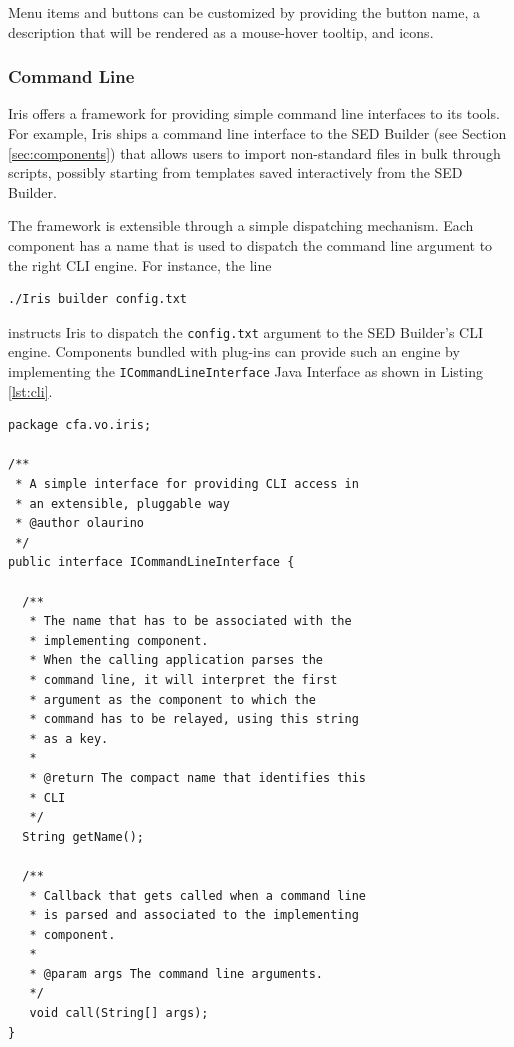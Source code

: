 \documentclass[preprint,authoryear,5p]{elsarticle}
\begin{document}
Menu items and buttons can be customized by providing the button name, a
description that will be rendered as a mouse-hover tooltip, and icons.

\subsubsection{Command Line} Iris offers a framework for providing simple
command line interfaces to its tools. For example, Iris ships a command line
interface to the SED Builder (see Section \ref{sec:components}) that allows
users to import non-standard files in bulk through scripts, possibly starting
from templates saved interactively from the SED Builder.

The framework is extensible through a simple dispatching mechanism. Each
component has a name that is used to dispatch the command line argument to the
right CLI engine. For instance, the line
\begin{lstlisting}[style=code]
./Iris builder config.txt
\end{lstlisting}
instructs Iris to dispatch the \verb|config.txt| argument to the SED Builder's
CLI engine. Components bundled with plug-ins can provide such an engine by implementing the
\verb|ICommandLineInterface| Java Interface as shown in Listing \ref{lst:cli}.


\begin{lstlisting}[style=java,
	caption={Every Iris component can expose a command line interface. Iris dispatches the command line arguments for the relative component to process. This code is written in Java.},
	label=lst:cli]
package cfa.vo.iris;

/**
 * A simple interface for providing CLI access in 
 * an extensible, pluggable way
 * @author olaurino
 */
public interface ICommandLineInterface {

  /**
   * The name that has to be associated with the
   * implementing component.
   * When the calling application parses the 
   * command line, it will interpret the first
   * argument as the component to which the 
   * command has to be relayed, using this string
   * as a key.
   *
   * @return The compact name that identifies this
   * CLI
   */
  String getName();

  /**
   * Callback that gets called when a command line 
   * is parsed and associated to the implementing 
   * component.
   *
   * @param args The command line arguments.
   */
   void call(String[] args);
}
\end{lstlisting}
\end{document}
